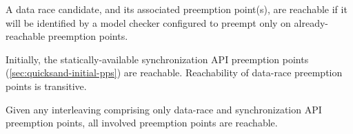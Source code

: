 \vspace{0.5em}
\begin{definition}[Reachability]
	A data race candidate, and its associated preemption point(s),
	are reachable if it will be identified by a model checker
	configured to preempt only on already-reachable preemption points.
\end{definition}
\vspace{0.5em}

Initially, the statically-available synchronization API preemption points (\cref{sec:quicksand-initial-pps})
are reachable.
Reachability of data-race preemption points is transitive.

\vspace{0.5em}
\begin{lemma}
        Given any interleaving comprising only data-race and synchronization API preemption points,
        all involved preemption points are reachable.
        \label{lem:saturation}
\end{lemma}

